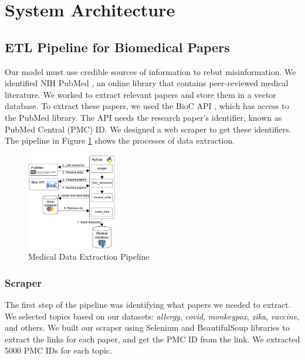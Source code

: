 
\section{System Architecture}


\subsection{ETL Pipeline for Biomedical Papers}

Our model must use credible sources of information to rebut misinformation. We identified NIH PubMed \cite{pubmed}, an online library that contains peer-reviewed medical literature. We worked to extract relevant papers and store them in a vector database. To extract these papers, we used the BioC API \cite{bioinformatics}, which has access to the PubMed library. The API needs the research paper's identifier, known as PubMed Central (PMC) ID. We designed a web scraper to get these identifiers. The pipeline in Figure \ref{fig:etl} shows the processes of data extraction. 

\begin{figure}[htbp]
	\begin{center}
		\includegraphics[width=0.35\textwidth]{figures/ETL_Pipeline.jpeg} %
	\end{center}
	\caption{Medical Data Extraction Pipeline} %
	\label{fig:etl}
\end{figure}

\subsubsection{Scraper}
The first step of the pipeline was identifying what papers we needed to extract. We selected topics based on our datasets: \textit{allergy}, \textit{covid}, \textit{monkeypox}, \textit{zika}, \textit{vaccine}, and others. We built our scraper using Selenium and BeautifulSoup libraries to extract the links for each paper, and get the PMC ID  from the link.  We extracted 5000 PMC IDs for each topic.

